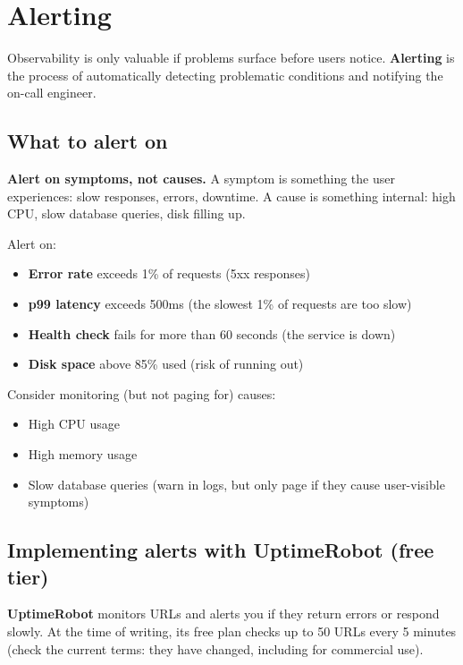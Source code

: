 \setcounter{section}{5}
\section{Alerting}\label{35-observability:356-alerting}

Observability is only valuable if problems surface before users notice. \textbf{Alerting} is the process of automatically detecting problematic conditions and notifying the on-call engineer.

\subsection*{What to alert on}\label{35-observability:what-to-alert-on}

\textbf{Alert on symptoms, not causes.} A symptom is something the user experiences: slow responses, errors, downtime. A cause is something internal: high CPU, slow database queries, disk filling up.

Alert on:

\begin{itemize}
\tightlist
\item
  \textbf{Error rate} exceeds 1\% of requests (5xx responses)
\item
  \textbf{p99 latency} exceeds 500ms (the slowest 1\% of requests are too slow)
\item
  \textbf{Health check} fails for more than 60 seconds (the service is down)
\item
  \textbf{Disk space} above 85\% used (risk of running out)
\end{itemize}

\noindent{}Consider monitoring (but not paging for) causes:

\begin{itemize}
\tightlist
\item
  High CPU usage
\item
  High memory usage
\item
  Slow database queries (warn in logs, but only page if they cause user-visible symptoms)
\end{itemize}

\subsection*{Implementing alerts with UptimeRobot (free tier)}\label{35-observability:implementing-alerts-with-uptimerobot-free-tier}

\textbf{UptimeRobot} monitors URLs and alerts you if they return errors or respond slowly. At the time of writing, its free plan checks up to 50 URLs every 5 minutes (check the current terms: they have changed, including for commercial use).

